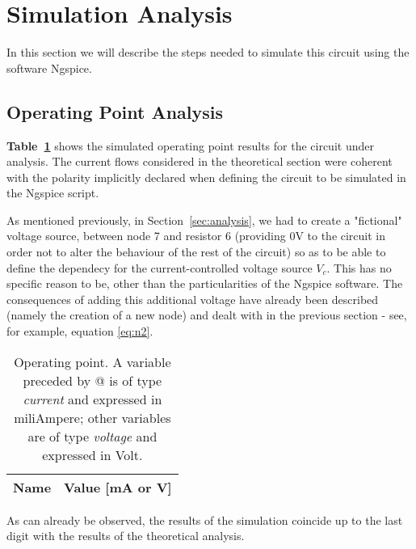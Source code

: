 \section{Simulation Analysis}
\label{sec:simulation}
In this section we will describe the steps needed to simulate this circuit using the software Ngspice.
\subsection{Operating Point Analysis}
\textbf{Table~\ref{tab:op}} shows the simulated operating point results for the circuit
under analysis. The current flows considered in the theoretical section were coherent with the polarity implicitly declared when defining the circuit to be simulated in the Ngspice script.\par
As mentioned previously, in Section~\ref{sec:analysis}, we had to create a "fictional" voltage source, between node 7 and resistor 6 (providing 0V to the circuit in order not to alter the behaviour of the rest of the circuit) so as to be able to define the dependecy for the current-controlled voltage source {\it $V_c$}. This has no specific reason to be, other than the particularities of the Ngspice software. The consequences of adding this additional voltage have already been described (namely the creation of a new node) and dealt with in the previous section - see, for example, equation \ref{eq:n2}.\par

\begin{table}[h]
  \centering
  \begin{tabular}{|l|r|}
    \hline    
    {\bf Name} & {\bf Value [mA or V]} \\ \hline
    
  \end{tabular}
  \caption{Operating point. A variable preceded by @ is of type {\em current}
    and expressed in miliAmpere; other variables are of type {\it voltage} and expressed in
    Volt.}
  \label{tab:op}
\end{table}

As can already be observed, the results of the simulation coincide up to the last digit with the results of the theoretical analysis.
